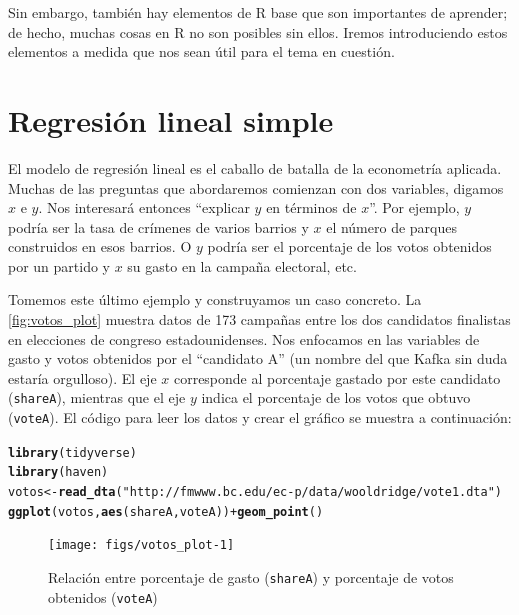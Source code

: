 \documentclass[12pt]{report}\usepackage[]{graphicx}\usepackage[]{color}
\makeatletter
\newcommand{\hlstr}[1]{\textcolor[rgb]{0.192,0.494,0.8}{#1}}%
\newcommand{\hlopt}[1]{\textcolor[rgb]{0,0,0}{#1}}%
\newcommand{\hlstd}[1]{\textcolor[rgb]{0.345,0.345,0.345}{#1}}%
\newcommand{\hlkwb}[1]{\textcolor[rgb]{0.69,0.353,0.396}{#1}}%
\newcommand{\hlkwd}[1]{\textcolor[rgb]{0.737,0.353,0.396}{\textbf{#1}}}%
\newenvironment{kframe}{%
 \def\at@end@of@kframe{}%
 \ifinner\ifhmode%
  \def\at@end@of@kframe{\end{minipage}}%
  \begin{minipage}{\columnwidth}%
 \fi\fi%
 \def\FrameCommand##1{\hskip\@totalleftmargin \hskip-\fboxsep
 \colorbox{shadecolor}{##1}\hskip-\fboxsep
     \hskip-\linewidth \hskip-\@totalleftmargin \hskip\columnwidth}%
 \MakeFramed {\advance\hsize-\width
   \@totalleftmargin\z@ \linewidth\hsize
   \@setminipage}}%
 {\par\unskip\endMakeFramed%
 \at@end@of@kframe}
\newenvironment{knitrout}{}{} %
\makeatother
\begin{document}
Sin embargo, también hay elementos de R base que son importantes de aprender; de hecho, muchas cosas en R no son posibles sin ellos. Iremos introduciendo estos elementos a medida que nos sean útil para el tema en cuestión.




\chapter{Regresión lineal simple}



El modelo de regresión lineal es el caballo de batalla de la econometría aplicada.
Muchas de las preguntas que abordaremos comienzan con dos variables, digamos $x$ e $y$. Nos interesará entonces ``explicar $y$ en términos de $x$''.
Por ejemplo, $y$ podría ser la tasa de crímenes de varios barrios y $x$ el número de parques construidos en esos barrios.
O $y$ podría ser el porcentaje de los votos obtenidos por un partido y $x$ su gasto en la campaña electoral, etc.

Tomemos este último ejemplo y construyamos un caso concreto.
La \autoref{fig:votos_plot} muestra datos de 173 campañas entre los dos candidatos finalistas en elecciones de congreso estadounidenses.
Nos enfocamos en las variables de gasto y votos obtenidos por el ``candidato A'' (un nombre del que Kafka sin duda estaría orgulloso).
El eje $x$ corresponde al porcentaje gastado por este candidato (\verb|shareA|), mientras que el eje $y$ indica el porcentaje de los votos que obtuvo (\verb|voteA|).
El código para leer los datos y crear el gráfico se muestra a continuación:

\begin{knitrout}
\color{fgcolor}\begin{kframe}
\begin{alltt}
\hlkwd{library}\hlstd{(tidyverse)}
\hlkwd{library}\hlstd{(haven)}
\hlstd{votos} \hlkwb{<-} \hlkwd{read_dta}\hlstd{(}\hlstr{"http://fmwww.bc.edu/ec-p/data/wooldridge/vote1.dta"}\hlstd{)}
\hlkwd{ggplot}\hlstd{(votos,} \hlkwd{aes}\hlstd{(shareA, voteA))} \hlopt{+} \hlkwd{geom_point}\hlstd{()}
\end{alltt}
\end{kframe}\begin{figure}[htb]

{\centering \texttt{[image: figs/votos\_plot-1]} 

}

\caption[Relación entre porcentaje de gasto (\texttt{shareA}) y porcentaje de votos obtenidos (\texttt{voteA})]{Relación entre porcentaje de gasto (\texttt{shareA}) y porcentaje de votos obtenidos (\texttt{voteA})}\label{fig:votos_plot}
\end{figure}


\end{knitrout}
\end{document}
